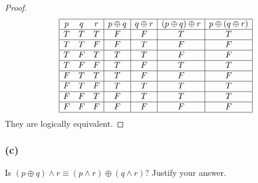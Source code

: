 \documentclass[14pt]{extarticle}
\begin{document}
\begin{proof}
    $$
        \begin{array}{|ccc|c|c|c|c|}
            \hline
            p & q & r & p \oplus q & q \oplus r & (p \oplus q) \oplus r & p \oplus (q \oplus r) \\
            \hline
            T & T & T & F          & F          & T                     & T                     \\
            \hline
            T & T & F & F          & T          & F                     & F                     \\
            \hline
            T & F & T & T          & T          & F                     & F                     \\
            \hline
            T & F & F & T          & F          & T                     & T                     \\
            \hline
            F & T & T & T          & F          & F                     & F                     \\
            \hline
            F & T & F & T          & T          & T                     & T                     \\
            \hline
            F & F & T & F          & T          & T                     & T                     \\
            \hline
            F & F & F & F          & F          & F                     & F                     \\
            \hline
        \end{array}
    $$
    They are logically equivalent.
\end{proof}

\subsubsection{(c)}
Is $(p \oplus q) \wedge r \equiv (p \wedge r) \oplus (q \wedge r)$? Justify your answer.
\end{document}
